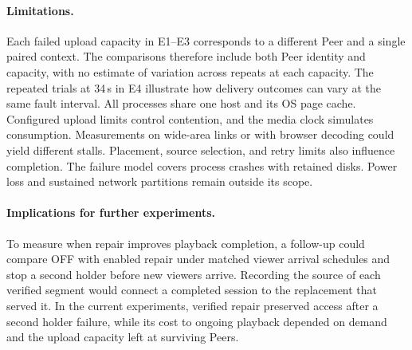 \paragraph{Limitations.}
Each failed upload capacity in E1--E3 corresponds to a different Peer
and a single paired context. The comparisons therefore include both
Peer identity and capacity, with no estimate of variation across repeats
at each capacity. The repeated trials at 34\,s in E4 illustrate how
delivery outcomes can vary at the same fault interval. All processes
share one host and its OS page cache. Configured upload limits control
contention, and the media clock simulates consumption. Measurements on
wide-area links or with browser decoding could yield different stalls.
Placement, source selection, and retry limits also influence completion.
The failure model covers process crashes with retained disks. Power loss
and sustained network partitions remain outside its scope.

\paragraph{Implications for further experiments.}
To measure when repair improves playback completion, a follow-up could
compare OFF with enabled repair under matched viewer arrival schedules and stop
a second holder before new viewers arrive. Recording the source of each
verified segment would connect a completed session to the replacement
that served it. In the current experiments, verified repair preserved
access after a second holder failure, while its cost to ongoing playback
depended on demand and the upload capacity left at surviving Peers.
